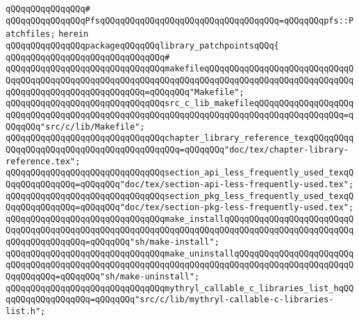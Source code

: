 \verb|qQQqqQQqqQQqqQQq#|\newline
\verb|qQQqqQQqqQQqqQQqPfsqQQqqQQqqQQqqQQqqQQqqQQqqQQqqQQqqQQq=qQQqqQQqpfs::Patchfiles;|\newline
\verb|herein|\newline
\newline
\verb|qQQqqQQqqQQqqQQqpackageqQQqqQQqlibrary_patchpointsqQQq{|\newline
\verb|qQQqqQQqqQQqqQQqqQQqqQQqqQQqqQQq#|\newline
\newline
\verb|qQQqqQQqqQQqqQQqqQQqqQQqqQQqqQQqmakefileqQQqqQQqqQQqqQQqqQQqqQQqqQQqqQQqqQQqqQQqqQQqqQQqqQQqqQQqqQQqqQQqqQQqqQQqqQQqqQQqqQQqqQQqqQQqqQQqqQQqqQQqqQQqqQQqqQQqqQQqqQQqqQQq=qQQqqQQq"Makefile";|\newline
\newline
\verb|qQQqqQQqqQQqqQQqqQQqqQQqqQQqqQQqsrc_c_lib_makefileqQQqqQQqqQQqqQQqqQQqqQQqqQQqqQQqqQQqqQQqqQQqqQQqqQQqqQQqqQQqqQQqqQQqqQQqqQQqqQQqqQQqqQQq=qQQqqQQq"src/c/lib/Makefile";|\newline
\newline
\verb|qQQqqQQqqQQqqQQqqQQqqQQqqQQqqQQqchapter_library_reference_texqQQqqQQqqQQqqQQqqQQqqQQqqQQqqQQqqQQqqQQqqQQq=qQQqqQQq"doc/tex/chapter-library-reference.tex";|\newline
\newline
\verb|qQQqqQQqqQQqqQQqqQQqqQQqqQQqqQQqsection_api_less_frequently_used_texqQQqqQQqqQQqqQQq=qQQqqQQq"doc/tex/section-api-less-frequently-used.tex";|\newline
\verb|qQQqqQQqqQQqqQQqqQQqqQQqqQQqqQQqsection_pkg_less_frequently_used_texqQQqqQQqqQQqqQQq=qQQqqQQq"doc/tex/section-pkg-less-frequently-used.tex";|\newline
\newline
\verb|qQQqqQQqqQQqqQQqqQQqqQQqqQQqqQQqmake_installqQQqqQQqqQQqqQQqqQQqqQQqqQQqqQQqqQQqqQQqqQQqqQQqqQQqqQQqqQQqqQQqqQQqqQQqqQQqqQQqqQQqqQQqqQQqqQQqqQQqqQQqqQQqqQQq=qQQqqQQq"sh/make-install";|\newline
\verb|qQQqqQQqqQQqqQQqqQQqqQQqqQQqqQQqmake_uninstallqQQqqQQqqQQqqQQqqQQqqQQqqQQqqQQqqQQqqQQqqQQqqQQqqQQqqQQqqQQqqQQqqQQqqQQqqQQqqQQqqQQqqQQqqQQqqQQqqQQqqQQq=qQQqqQQq"sh/make-uninstall";|\newline
\newline
\verb|qQQqqQQqqQQqqQQqqQQqqQQqqQQqqQQqmythryl_callable_c_libraries_list_hqQQqqQQqqQQqqQQqqQQq=qQQqqQQq"src/c/lib/mythryl-callable-c-libraries-list.h";|\newline
\newline
